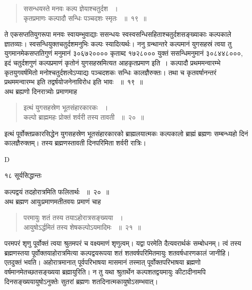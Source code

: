 \documentclass[11pt, openany]{book}
\begin{document}
\begin{quote}
 {\ssi ससन्धयस्ते मनवः कल्प ज्ञेयाश्चतुर्दश ~।\\
कृतप्रमाणः कल्पादौ सन्धिः पञ्चदशः स्मृतः ~॥~१९~॥}
\end{quote}
\begin{sloppypar}
 ते एकसप्ततियुगरूपा मनवः स्वायम्भुवाद्याः ससन्धयः स्वस्वसन्धिसहिताश्चतुर्दशसङ्ख्याकाः कल्पकाले ज्ञातव्याः। स्वसन्धियुक्तचतुर्दशमनुभिः कल्पः स्यादित्यर्थः। ननु ग्रन्थान्तरे कल्पमानं युगसहस्रं त्वया तु युगमानमेकसप्ततिगुणं मनुमानं ३०६७२०००० कृताब्द १७२८००० युक्तं ससन्धिमनुमानं ३०८४४८०००, इदं चतुर्दशगुणं कल्पप्रमाणं कृतोनं युगसहस्रमित्यत आह\textendash कृतप्रमाण इति~। कल्पादौ प्रथममन्वारम्भे कृतयुगवर्षमितो मनोश्चतुर्दशत्वेऽप्याद्यः पञ्चदशकः सन्धिः कालज्ञैरुक्तः। तथा च कृतवर्षानन्तरं प्रथममन्वारम्भ इति तद्वर्षयोजनेनाविरोध इति भावः ~॥~१९~॥\\
 \noindent अथ ब्रह्यणो दिनरात्र्योः प्रमाणमाह\textendash
\end{sloppypar}

 
 \begin{quote}
 {\ssi इत्थं युगसहस्रेण भूतसंहारकारकः ~।\\
कल्पो ब्राह्ममहः प्रोक्तं शर्वरी तस्य तावती ~॥~२०~॥}
\end{quote}
\begin{sloppypar}
 इत्थं पूर्वोक्तप्रकारसिद्धेन युगसहस्रेण भूतसंहारकारको ब्राह्मलयात्मकः कल्पकालो ब्राह्मं ब्रह्मणः सम्बन्ध्यहो दिनं कालज्ञैरुक्तम्। तस्य ब्रह्मणस्तावती दिनपरिमिता शर्वरी रात्रिः।
\end{sloppypar}

 {\tiny{D}}
 
 \newpage
 

\noindent १८ \hspace{4cm} सूर्यसिद्धान्तः
\vspace{1cm}
 
कल्पद्वयं तदहोरात्रमिति फलितार्थः ~॥~२०~॥\\ अथ ब्रह्मण आयुःप्रमाणमतीतवयः प्रमाणं चाह\textendash

 
 \begin{quote}
 {\ssi परमायुः शतं तस्य तयाऽहोरात्रसङ्ख्यया ~।\\
आयुषोऽर्द्धमितं तस्य शेषकल्पोऽयमादिमः ~॥~२१~॥ }
\end{quote}
\begin{sloppypar}
 परमपरं शृणु पूर्वोक्तं त्वया श्रुतमपरं च वक्ष्यमाणं शृणुत्वम्। यद्वा परमेति दैत्यवरार्थकं सम्बोधनम्। त्वं तस्य ब्रह्मणस्तया पूर्वोक्तयाहोरात्रमित्या कल्पद्वयरूपया शतं शतवर्षपरिमितमायुः शतवर्षधारणकालं जानीहि। एतदुक्तं भवति। अहोरात्रमानात् पूर्वपरिभाषया मासमानं तस्मात् पूर्वोक्तपरिभाषया ब्रह्मणो वर्षमानमेतच्छतसङ्ख्यया ब्रह्मायुरिति। न तु यथा श्रुतार्थेन कल्पशतद्वयमायुः कीटादीनामपि दिनसङ्ख्ययायुषोऽनुक्तेः सुतरां ब्रह्मणः शतदिनात्मकायुषोऽसम्भवात्।
\end{sloppypar}
\end{document}
